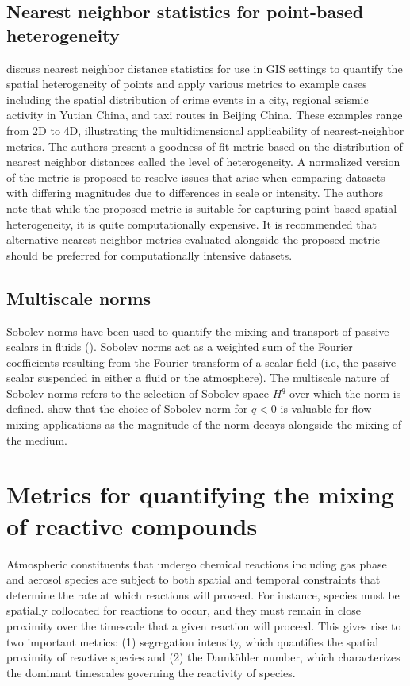 \subsection{Nearest neighbor statistics for point-based heterogeneity}
\cite{shu_quantifying_2019} discuss nearest neighbor distance statistics for use in GIS settings to quantify the spatial heterogeneity of points and apply various metrics to example cases including the spatial distribution of crime events in a city, regional seismic activity in Yutian China, and taxi routes in Beijing China. These examples range from 2D to 4D, illustrating the multidimensional applicability of nearest-neighbor metrics. The authors present a goodness-of-fit metric based on the distribution of nearest neighbor distances called the level of heterogeneity. A normalized version of the metric is proposed to resolve issues that arise when comparing datasets with differing magnitudes due to differences in scale or intensity. The authors note that while the proposed metric is suitable for capturing point-based spatial heterogeneity, it is quite computationally expensive. It is recommended that alternative nearest-neighbor metrics evaluated alongside the proposed metric should be preferred for computationally intensive datasets. 

\subsection{Multiscale norms}
Sobolev norms have been used to quantify the mixing and transport of passive scalars in fluids (\cite{thiffeault_using_2012}). Sobolev norms act as a weighted sum of the Fourier coefficients resulting from the Fourier transform of a scalar field (i.e, the passive scalar suspended in either a fluid or the atmosphere). The multiscale nature of Sobolev norms refers to the selection of Sobolev space $H^q$ over which the norm is defined. \cite{thiffeault_using_2012} show that the choice of Sobolev norm for $q<0$ is valuable for flow mixing applications as the magnitude of the norm decays alongside the mixing of the medium.

\section{Metrics for quantifying the mixing of reactive compounds}\label{metrics-reactive-mixing}
Atmospheric constituents that undergo chemical reactions including gas phase and aerosol species are subject to both spatial and temporal constraints that determine the rate at which reactions will proceed. For instance, species must be spatially collocated for reactions to occur, and they must remain in close proximity over the timescale that a given reaction will proceed. This gives rise to two important metrics: (1) segregation intensity, which quantifies the spatial proximity of reactive species and (2) the Damköhler number, which characterizes the dominant timescales governing the reactivity of species.

